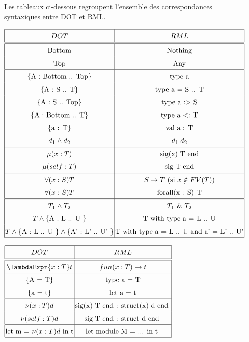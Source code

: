 Les tableaux ci-dessous regroupent l'ensemble des correspondances \\ syntaxiques entre DOT et
RML.

\begin{center}
$\arraycolsep=1.0pt\def\arraystretch{1.5}
\begin{array}{|c|c|}
  \hline
  DOT & RML \\
  \hline \hline
  \text{Bottom} & \text{Nothing} \\
  \text{Top} & \text{Any} \\
  \hline
  \left\{ \text{A : Bottom .. Top} \right\} & \text{type a} \\
  \left\{ \text{A : S .. T} \right\} & \text{type a = S  .. T} \\
  \left\{ \text{A : S .. Top} \right\} & \text{type a $:>$ S} \\
  \left\{ \text{A : Bottom .. T} \right\} & \text{type a $<:$ T} \\
  \left\{ \text{a : T} \right\} & \text{val a : T} \\
  d_{1} \wedge d_{2} & d_{1} \; d_{2} \\
  \hline
  \mu(x : T) & \text{sig(x) T end} \\
  \mu(self : T) & \text{sig T end} \\
  \hline
  \forall(x : S) T & S \rightarrow T \text{ (si $x \notin FV(T)$)}\\
  \forall(x : S) T & \text{forall(x : S) T} \\
  \hline
  T_{1} \wedge T_{2} & T_{1} \text{ \& } T_{2} \\
  T \wedge \left\{ \text{A : L .. U } \right\} & \text{T with type a = L .. U} \\
  T \wedge \left\{ \text{A : L .. U } \right\} \wedge \left\{ \text{A' : L' ..
  U' } \right\} & \text{T with type a = L .. U and a' = L' .. U'} \\
  \hline
\end{array}
$
\end{center}

\begin{center}
$\arraycolsep=1.0pt\def\arraystretch{1.5}
\begin{array}{|c|c|}
  \hline
  DOT & RML \\
  \hline \hline
  \lambdaExpr{x : T} t & fun(x : T) \rightarrow t \\
  \hline
  \left\{ \text{A = T} \right\} & \text{type a = T} \\
  \left\{ \text{a = t} \right\} & \text{let a = t} \\
  \hline
  \nu(x : T) d & \text{sig(x) T end : struct(x) d end } \\
  \nu(self : T) d & \text{sig T end : struct d end } \\
  \hline
  \text{let m = } \nu(x : T) d \text{ in t} & \text{let module M = ... in t } \\
  \hline
\end{array}
$
\end{center}

